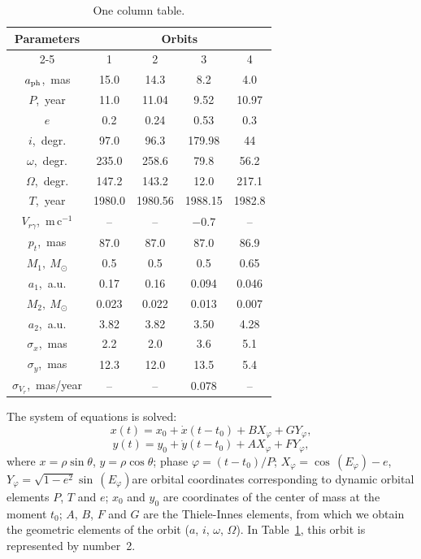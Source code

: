 \documentclass[
 aps, pra,
 amsmath,amssymb,
 11pt,
 final,
tightenlines,
 twoside,
 twocolumn,
 nofloats,
nofootinbib,
 superscriptaddress,
showkeys,
showkeywords,
 ]
{revtex4-2}
\begin{document}
\begin{table}
\caption {One column table.} \label{orbF}
\medskip
\begin{tabular}{c|c|c|c|c}
\hline
\multirow{2}{*}{Parameters} & \multicolumn{4}{c}{Orbits}  \\
\cline{2-5}
 & 1 & 2 & 3 & 4 \\
\hline
$a_{\rm ph}$,~mas          & 15.0    & 14.3    & 8.2     & 4.0 \\
$P$,~year                   & 11.0    & 11.04   & 9.52    & 10.97 \\
$e$                        & 0.2     & 0.24    & 0.53    & 0.3 \\
$i$,~degr.                 & 97.0    & 96.3    & 179.98  & 44 \\
$\omega$,~degr.            & 235.0   & 258.6   & 79.8    & 56.2 \\
$\Omega$,~degr.            & 147.2   & 143.2   & 12.0    & 217.1 \\
$T$,~year                   & 1980.0  & 1980.56 & 1988.15 & 1982.8 \\
$V_{r\gamma}$,~m\,c$^{-1}$ & --      & --      & $-0.7$  & -- \\
\hline
$p_t$,~mas                 & 87.0    & 87.0    & 87.0    & 86.9\\
$M_1,~M_\odot$             & 0.5     & 0.5     & 0.5     & 0.65 \\
$a_1$,~a.u.                & 0.17    & 0.16    & 0.094   & 0.046 \\
$M_2,~M_\odot$             & 0.023   & 0.022   & 0.013   & 0.007 \\
$a_2$,~a.u.                & 3.82    & 3.82    & 3.50    & 4.28 \\
\hline
$\sigma_x$,~mas            & 2.2     & 2.0     & 3.6     & 5.1 \\
$\sigma_y$,~mas            & 12.3    & 12.0    & 13.5    & 5.4 \\
$\sigma_{V_r}$,~mas/year    & --      & --      & 0.078   & -- \\
\hline
\end{tabular}
\end{table}

The system of equations is solved:
\begin{equation}
\label{four} x(t)=x_0+\dot{x}(t-t_0)+BX_{\varphi}+GY_{\varphi},
\end{equation}
\begin{equation}
\label{five} y(t)=y_0+\dot{y}(t-t_0)+AX_{\varphi}+FY_{\varphi},
\end{equation}
where $x=\rho\sin\theta$, $y=\rho\cos\theta$; phase
$\varphi=(t-t_0)/P$; $X_{\varphi}=\cos\,(E_{\varphi})-e$,
$Y_{\varphi}=\sqrt{1-e^2}\sin\,(E_{\varphi})$are orbital
coordinates corresponding to dynamic orbital elements $P$, $T$
and $e$; $x_0$ and $y_0$ are coordinates of the center of mass
at the moment $t_0$; $A$, $B$, $F$ and $G$ are the Thiele-Innes
elements, from which we obtain the geometric elements of the orbit
($a$, $i$, $\omega$, $\Omega$). In Table~\ref{orbF}, this orbit
is represented by number~2.
\end{document}

